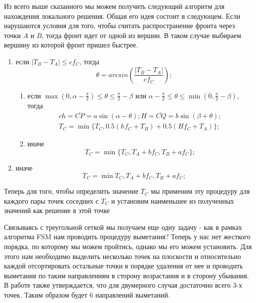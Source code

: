 \documentclass[a4paper,12pt]{article}
\begin{document}
Из всего выше сказанного мы можем получить следующий алгоритм для нахождения
локального решения. Общая его идея состоит в следующем. Если нарушаются условия
для того, чтобы считать распространение фронта через точки $A$ и $B$, тогда
фронт идет от одной из вершин. В таком случае выбираем вершину из которой фронт
пришел быстрее.

\begin{enumerate}
\item если $|T_B-T_A| \le c f_C$, тогда
  \begin{equation*}
    \theta = arcsin \left(\frac{|T_B-T_A|}{c f_C}\right);
  \end{equation*}
  \begin{enumerate}
  \item если $\max (0,\alpha - \frac{\pi}{2}) \le \theta \le
    \frac{\pi}{2} - \beta$ или $\alpha - \frac{\pi}{2} \le \theta \le
    \min(0, \frac{\pi}{2} - \beta)$, тогда
    \begin{equation*}
      \begin{aligned}{c}
        h = \overline{CP} = a \sin(\alpha - \theta); H =
        \overline{CQ}=
        b \sin (\beta + \theta);\\
        T_C = \min\{T_C,0.5(h f_C + T_B)+0.5(H f_C + T_A)\};
      \end{aligned}
    \end{equation*}
  \item иначе
    \begin{equation*}
      T_C = \min\{T_C,T_A+b f_C, T_B + a f_C\};
    \end{equation*}
  \end{enumerate}
\item иначе
  \begin{equation*}
    T_C = \min{T_C,T_A+b f_C, T_B + a f_C};
  \end{equation*}

\end{enumerate}

Теперь для того, чтобы определить значение $T_C$ мы применим эту
процедуру для каждого пары точек соседних с $T_C$ и установим
наименьшее из полученных значений как решение в этой точке

Связываясь с треугольной сеткой мы получаем еще одну задачу - как в рамках
алгоритма FSM нам проводить процедуру выметания? Теперь у нас нет жесткого
порядка, по которому мы можем пройтись, однако мы его можем установить. Для
этого нам необходимо выделить несколько точек на плоскости и относительно
каждой  отсортировать остальные точки в порядке удаления от нее и проводить
выметания по таким направлениям в сторону возрастания и в сторону убывания.
В работе \cite{FS2007} также утверждается, что для двумерного случая
достаточно всего 3-х точек. Таким образом будет 6 направлений выметаний.
\end{document}
